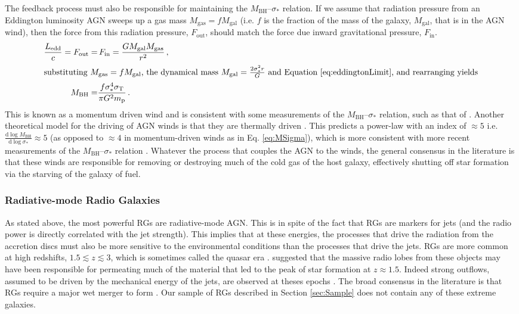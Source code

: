 			The feedback process must also be responsible for maintaining the $M_\text{BH}$--$\sigma_\ast$ relation. If we assume that radiation pressure from an Eddington luminosity AGN sweeps up a gas mass $M_\text{gas} = f M_\text{gal}$ (i.e. $f$ is the fraction of the mass of the galaxy, $M_\text{gal}$, that is in the AGN wind), then the force from this radiation pressure, $F_\text{out}$, should match the force due inward gravitational pressure, $F_\text{in}$.
			\begin{align}
				\frac{L_\text{edd}}{c} = F_\mathrm{out} = & \, F_\text{in} = \frac{G M_\text{gal} M_\text{gas}}{r^2} \, , \\
				\intertext{substituting $M_\text{gas} = f M_\text{gal}$, the dynamical mass $M_\text{gal} = \frac{2\sigma_\ast^2 r}{G}$ and Equation \ref{eq:eddingtonLimit}, and rearranging yields}
				M_\text{BH} = & \frac{f \sigma_\ast^4 \sigma_\mathrm{T}}{\pi G^2 m_\mathrm{p}} \, .
				\label{eq:MSigma}
			\end{align}
			This is known as a momentum driven wind \citep[e.g.][]{Fabian1999} and is consistent with some measurements of the $M_\text{BH}$--$\sigma_\ast$ relation, such as that of \citet{Gultekin2009}.
			Another theoretical model for the driving of AGN winds is that they are thermally driven \citep{Silk1998}. This predicts a power-law with an index of $\approx 5$ i.e. $\frac{\mathrm{d} \log M_\mathrm{BH}}{\mathrm{d}\log \sigma_\ast} \approx 5$ (as opposed to $\approx 4$ in momentum-driven winds as in Eq. \ref{eq:MSigma}), which is more consistent with more recent measurements of the $M_\mathrm{BH}$--$\sigma_\ast$ relation \citep[e.g.][]{McConnell2013}. 
			Whatever the process that couples the AGN to the winds, the general consensus in the literature is that these winds are responsible for removing or destroying much of the cold gas of the host galaxy, effectively shutting off star formation via the starving of the galaxy of fuel. 
		\subsubsection{Radiative-mode Radio Galaxies}
			\label{subsubsec:RadiativeRadio}
			As stated above, the most powerful RGs are radiative-mode AGN. This is in spite of the fact that RGs are markers for jets (and the radio power is directly correlated with the jet strength). This implies that at these energies, the processes that drive the radiation from the accretion discs must also be more sensitive to the environmental conditions than the processes that drive the jets. RGs are more common at high redshifts, $1.5 \lesssim z \lesssim 3$, which is sometimes called the quasar era \citep{Miley2008}. \citet{Gopal-Krishna2001} suggested that the massive radio lobes from these objects may have been responsible for permeating much of the material that led to the peak of star formation at $z \approx 1.5$. Indeed strong outflows, assumed to be driven by the mechanical energy of the jets, are observed at theses epochs \citep[e.g.][]{Nesvadba2008, Maiolino2012}.
			The broad consensus in the literature is that RGs require a major wet merger to form \citep[e.g.][]{Malin1983, Quillen1992, Lim2000}. Our sample of RGs described in Section \ref{sec:Sample} does not contain any of these extreme galaxies.
